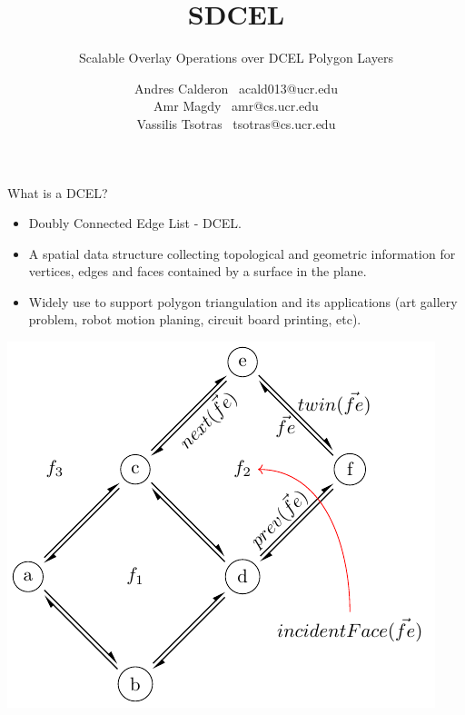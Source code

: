 \documentclass{beamer}
\title{SDCEL}
\subtitle{Scalable Overlay Operations over DCEL Polygon Layers}
\author{
    Andres Calderon \textperiodcentered \ acald013@ucr.edu \\
    Amr Magdy \textperiodcentered \ amr@cs.ucr.edu \\ 
    Vassilis Tsotras \textperiodcentered \ tsotras@cs.ucr.edu
}
\institute{University of California, Riverside}
\begin{document}
    \begin{frame}
        \maketitle
    \end{frame}

    \begin{frame}{What is a DCEL?}
        \begin{minipage}{0.65\textwidth}
        \begin{itemize}
            \item Doubly Connected Edge List - DCEL.
            \item A spatial data structure collecting topological and geometric information for vertices, edges and faces contained by a surface in the plane.
            \item Widely use to support polygon triangulation and its applications (art gallery problem, robot motion planing, circuit board printing, etc).
        \end{itemize}
        \end{minipage}\hfill %
        \begin{minipage}{0.34\textwidth}
            \centering
            \includegraphics[width=\textwidth]{figures/dcel_example}
        \end{minipage}
    \end{frame}
\end{document}
